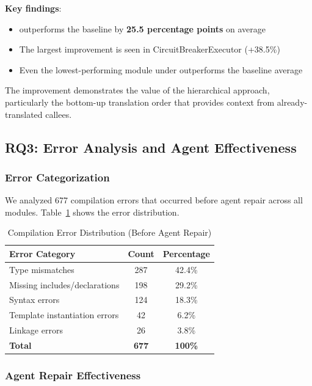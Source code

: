 \textbf{Key findings}:
\begin{itemize}
\item \tool{} outperforms the baseline by \textbf{25.5 percentage points} on average
\item The largest improvement is seen in CircuitBreakerExecutor (+38.5\%)
\item Even the lowest-performing module under \tool{} outperforms the baseline average
\end{itemize}

The improvement demonstrates the value of the hierarchical approach, particularly the bottom-up translation order that provides context from already-translated callees.

\subsection{RQ3: Error Analysis and Agent Effectiveness}

\subsubsection{Error Categorization}

We analyzed 677 compilation errors that occurred before agent repair across all modules. Table~\ref{tab:error-distribution} shows the error distribution.

\begin{table}[h]
\centering
\caption{Compilation Error Distribution (Before Agent Repair)}
\label{tab:error-distribution}
\begin{tabular}{lcc}
\toprule
\textbf{Error Category} & \textbf{Count} & \textbf{Percentage} \\
\midrule
Type mismatches & 287 & 42.4\% \\
Missing includes/declarations & 198 & 29.2\% \\
Syntax errors & 124 & 18.3\% \\
Template instantiation errors & 42 & 6.2\% \\
Linkage errors & 26 & 3.8\% \\
\midrule
\textbf{Total} & \textbf{677} & \textbf{100\%} \\
\bottomrule
\end{tabular}
\end{table}

\subsubsection{Agent Repair Effectiveness}


